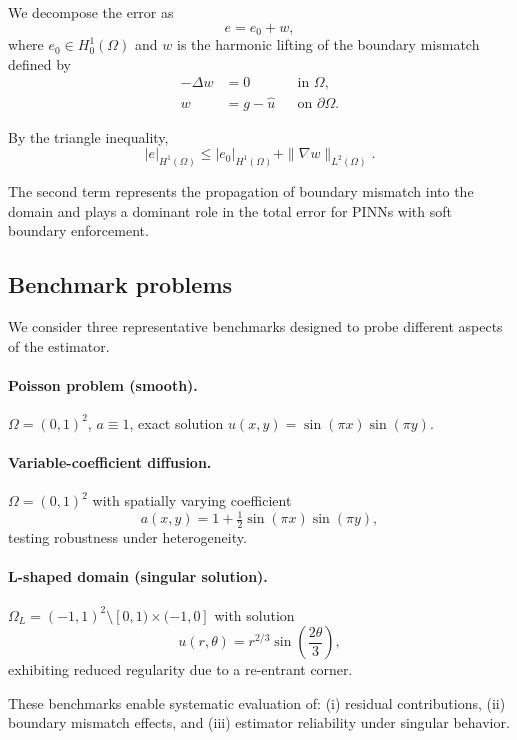 We decompose the error as
\begin{equation}\label{eq:error-decomposition}
e = e_0 + w,
\end{equation}
where $e_0 \in H^1_0(\Omega)$ and $w$ is the harmonic lifting of the
boundary mismatch defined by
\begin{equation}\label{eq:harmonic-lifting}
\begin{aligned}
- \Delta w &= 0 && \text{in } \Omega,\\
w &= g - \hat{u} && \text{on } \partial\Omega.
\end{aligned}
\end{equation}

By the triangle inequality,
\begin{equation}\label{eq:error-split}
|e|_{H^1(\Omega)} \le |e_0|_{H^1(\Omega)} + \|\nabla w\|_{L^2(\Omega)}.
\end{equation}

The second term represents the propagation of boundary mismatch into the domain
and plays a dominant role in the total error for PINNs with soft boundary
enforcement.

\subsection{Benchmark problems}

We consider three representative benchmarks designed to probe different
aspects of the estimator.

\paragraph{Poisson problem (smooth).}
$\Omega = (0,1)^2$, $a \equiv 1$, exact solution
$u(x,y) = \sin(\pi x)\sin(\pi y)$.

\paragraph{Variable-coefficient diffusion.}
$\Omega = (0,1)^2$ with spatially varying coefficient
\[
a(x,y) = 1 + \tfrac{1}{2}\sin(\pi x)\sin(\pi y),
\]
testing robustness under heterogeneity.

\paragraph{L-shaped domain (singular solution).}
$\Omega_L = (-1,1)^2 \setminus [0,1)\times(-1,0]$ with solution
\[
u(r,\theta) = r^{2/3}\sin\!\left(\frac{2\theta}{3}\right),
\]
exhibiting reduced regularity due to a re-entrant corner.

These benchmarks enable systematic evaluation of:
(i) residual contributions,
(ii) boundary mismatch effects,
and (iii) estimator reliability under singular behavior.